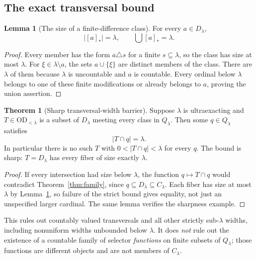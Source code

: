 \documentclass[11pt,letterpaper]{article}
\theoremstyle{definition}
\newtheorem{theorem}[definition]{Theorem}
\newtheorem{lemma}[definition]{Lemma}
\numberwithin{equation}{section}
\newcommand{\OD}{\mathrm{OD}}
\newcommand{\Dlam}{D_\lambda}
\newcommand{\Qlam}{Q_\lambda}
\newcommand{\Clam}{C_\lambda}
\newcommand{\ODlo}{\OD_{<\lambda}}
\newcommand{\qclass}[1]{[#1]_{*}}
\begin{document}
\subsection{The exact transversal bound}

\begin{lemma}[The size of a finite-difference class]\label{lem:classsize}
For every $a\in\Dlam$,
\[
|\qclass a|=\lambda,
\qquad \bigcup\qclass a=\lambda.
\]
\end{lemma}

\begin{proof}
Every member has the form $a\triangle s$ for a finite $s\subseteq\lambda$, so the class has size at most $\lambda$. For $\xi\in\lambda\setminus a$, the sets $a\cup\{\xi\}$ are distinct members of the class. There are $\lambda$ of them because $\lambda$ is uncountable and $a$ is countable. Every ordinal below $\lambda$ belongs to one of these finite modifications or already belongs to $a$, proving the union assertion.
\end{proof}

\begin{theorem}[Sharp transversal-width barrier]\label{thm:transversal-new}
Suppose $\lambda$ is ultraexacting and $T\in\ODlo$ is a subset of $\Dlam$ meeting every class in $\Qlam$. Then some $q\in\Qlam$ satisfies
\begin{equation}\label{eq:widthlambda}
|T\cap q|=\lambda.
\end{equation}
In particular there is no such $T$ with $0<|T\cap q|<\lambda$ for every $q$. The bound is sharp: $T=\Dlam$ has every fiber of size exactly $\lambda$.
\end{theorem}

\begin{proof}
If every intersection had size below $\lambda$, the function $q\mapsto T\cap q$ would contradict Theorem~\ref{thm:family}, since $q\subseteq\Dlam\subseteq\Clam$. Each fiber has size at most $\lambda$ by Lemma~\ref{lem:classsize}, so failure of the strict bound gives equality, not just an unspecified larger cardinal. The same lemma verifies the sharpness example.
\end{proof}

This rules out countably valued transversals and all other strictly sub-$\lambda$ widths, including nonuniform widths unbounded below $\lambda$. It does \emph{not} rule out the existence of a countable family of selector \emph{functions} on finite subsets of $\Qlam$; those functions are different objects and are not members of $\Clam$.
\end{document}
